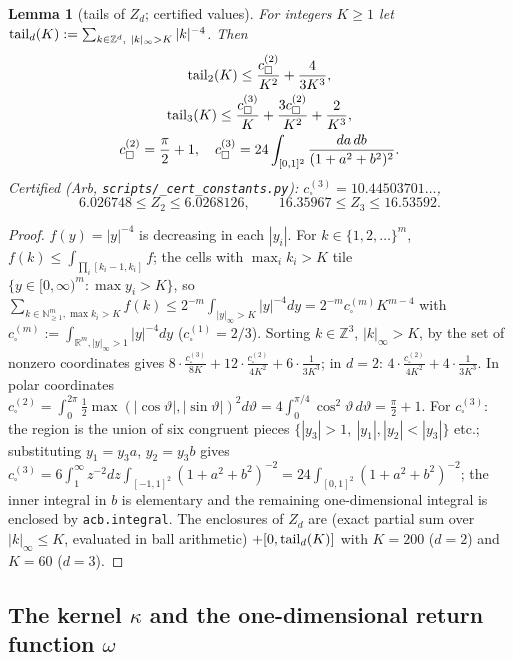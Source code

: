 \documentclass[11pt,a4paper]{article}
\newtheorem{lemma}[theorem]{Lemma}
\theoremstyle{definition}
\theoremstyle{remark}
\begin{document}
\begin{lemma}[{tails of $Z_d$; certified values}]
For integers $K\ge1$ let ${\rm tail}_d(K):=\sum_{k\in\mathbb Z^d,\ |k|_\infty>K}|k|^{-4}$. Then
\begin{gather*}
{\rm tail}_2(K)\le\frac{c_\square^{(2)}}{K^2}+\frac{4}{3K^3}, \\
{\rm tail}_3(K)\le\frac{c_\square^{(3)}}{K}+\frac{3c_\square^{(2)}}{K^2}+\frac{2}{K^3}, \\
c_\square^{(2)}=\frac\pi2+1,\quad c_\square^{(3)}=24\int_{[0,1]^2}\frac{da\,db}{(1+a^2+b^2)^2}.
\end{gather*}
Certified (Arb, \texttt{scripts/\_\allowbreak cert\_\allowbreak constants.py}): $c_\square^{(3)}=10.44503701\ldots$,
\begin{equation*}
6.026748\le Z_2\le6.0268126,\qquad 16.35967\le Z_3\le16.53592 .
\end{equation*}
\end{lemma}

\begin{proof}
$f(y)=|y|^{-4}$ is decreasing in each $|y_i|$. For $k\in\{1,2,\dots\}^m$, $f(k)\le\int_{\prod_i[k_i-1,k_i]}f$; the cells with $\max_ik_i>K$ tile $\{y\in[0,\infty)^m:\max y_i>K\}$, so $\sum_{k\in\mathbb N_{\ge1}^m,\max k_i>K}f(k)\le2^{-m}\int_{|y|_\infty>K}|y|^{-4}dy=2^{-m}c_\square^{(m)}K^{m-4}$ with $c_\square^{(m)}:=\int_{\mathbb R^m,|y|_\infty>1}|y|^{-4}dy$ ($c_\square^{(1)}=2/3$). Sorting $k\in\mathbb Z^3$, $|k|_\infty>K$, by the set of nonzero coordinates gives $8\cdot\frac{c^{(3)}_\square}{8K}+12\cdot\frac{c_\square^{(2)}}{4K^2}+6\cdot\frac{1}{3K^3}$; in $d=2$: $4\cdot\frac{c_\square^{(2)}}{4K^2}+4\cdot\frac1{3K^3}$. In polar coordinates $c^{(2)}_\square=\int_0^{2\pi}\frac12\max(|\cos\vartheta|,|\sin\vartheta|)^2d\vartheta=4\int_0^{\pi/4}\cos^2\vartheta\,d\vartheta=\frac\pi2+1$. For $c_\square^{(3)}$: the region is the union of six congruent pieces $\{|y_3|>1,\ |y_1|,|y_2|<|y_3|\}$ etc.; substituting $y_1=y_3a$, $y_2=y_3b$ gives $c_\square^{(3)}=6\int_1^\infty z^{-2}dz\int_{[-1,1]^2}(1+a^2+b^2)^{-2}=24\int_{[0,1]^2}(1+a^2+b^2)^{-2}$; the inner integral in $b$ is elementary and the remaining one-dimensional integral is enclosed by \texttt{acb.integral}. The enclosures of $Z_d$ are (exact partial sum over $|k|_\infty\le K$, evaluated in ball arithmetic) $+[0,{\rm tail}_d(K)]$ with $K=200$ ($d=2$) and $K=60$ ($d=3$).
\end{proof}

\subsection{The kernel $\kappa$ and the one-dimensional return function $\omega$}
\end{document}
